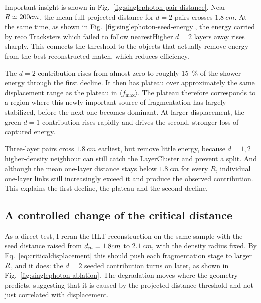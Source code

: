 Important insight is shown in Fig.~\ref{fig:singlephoton-pair-distance}.
Near $R\simeq200 cm$, the mean full projected distance for
$d=2$ pairs crosses $\SI{1.8}{cm}$. At the same time, as shown in
Fig.~\ref{fig:singlephoton-seed-energy}, the energy carried by reco
Tracksters which failed to follow nearestHigher $d=2$ layers away rises sharply. This connects the threshold to the objects that
actually remove energy from the best reconstructed match, which reduces efficiency.

The $d=2$ contribution rises from almost zero to roughly \SI{15}{\%} of the shower energy through the first decline. It then has plateau over
approximately the same displacement range as the plateau in
$\langle f_{\max}\rangle$. The plateau therefore corresponds to a region
where this newly important source of fragmentation has largely stabilized,
before the next one becomes dominant. At larger displacement, the green
$d=1$ contribution rises rapidly and drives the second, stronger loss of
captured energy.

Three-layer pairs cross $\SI{1.8}{cm}$ earliest, but remove little energy, because $d=1,2$ higher-density neighbour can still catch the LayerCluster and prevent a
split. And although the mean one-layer distance stays below $\SI{1.8}{cm}$ for every $R$, individual one-layer links still increasingly exceed it and produce the
observed contribution. This explains the first decline, the plateau and the
second decline.

\subsection{A controlled change of the critical distance}



As a direct test, I reran the HLT reconstruction on the same sample with the
seed distance raised from $d_{m}=1.8 cm$ to $\SI{2.1}{cm}$, with the density
radius fixed. By Eq.~\eqref{eq:criticaldisplacement} this should push each fragmentation stage to larger $R$, and it does: the $d=2$ seeded
contribution turns on later, as shown in Fig.~\ref{fig:singlephoton-ablation}. The
degradation moves where the geometry predicts, suggesting
that it is caused by the projected-distance threshold and not just correlated
with displacement.
